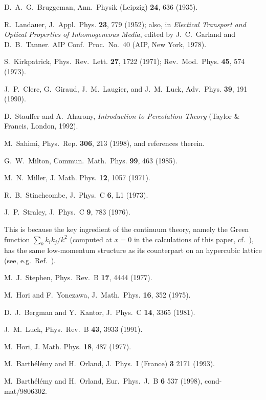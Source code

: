 \begin{references}
 D.~A.~G.~Bruggeman, Ann.\ Physik (Leipzig)
{\bf 24}, 636 (1935).

 R.~Landauer, J.~Appl.~Phys. {\bf 23}, 779 (1952);
also, in {\it Electical Transport and Optical Properties of 
Inhomogeneous Media}, edited by J.~C.~Garland and D.~B.~Tanner.
AIP Conf.~Proc.~No.\ 40 (AIP, New York, 1978).

 S.\ Kirkpatrick, Phys.\ Rev.\ Lett. {\bf 27},
1722 (1971); Rev.\ Mod.\ Phys. {\bf 45}, 574 (1973).

 J.~P.~Clerc, G.~Giraud, J.~M.~Laugier, and
J.~M.~Luck, Adv.\ Phys. {\bf 39}, 191 (1990).

 D.\ Stauffer and A.\ Aharony,
{\em Introduction to Percolation Theory} (Taylor \& Francis, London, 1992).

 M.\ Sahimi, Phys.\ Rep. {\bf 306}, 213 (1998),
and references therein.

 G.\ W.\ Milton, Commun.\ Math.\ Phys. {\bf 99}, 463
(1985).

 M.~N.~Miller, J. Math. Phys. {\bf 12}, 1057 (1971).

 R.~B.~Stinchcombe, J.\ Phys.\ C {\bf 6}, L1 (1973).

 J.~P.~Straley, J.\ Phys.\ C {\bf 9}, 783 (1976).

 This is because the key ingredient of the continuum
theory, namely the Green function $\sum_k k_i k_j/k^2$ (computed at $x=0$
in the calculations of this paper, cf.\ \cite{NOTE2}),
has the same low-momentum structure as its counterpart on an
hypercubic lattice (see, e.g.\ Ref.\ \cite{LUCK91}).

 M.~J.~Stephen, Phys.\ Rev.\ B {\bf 17}, 4444 (1977).

 M.~Hori and F.~Yonezawa, J.\ Math.\ Phys. {\bf 16},
352 (1975).

 D.~J.~Bergman and Y.~Kantor, J.\ Phys.\ C {\bf 14},
3365 (1981).

 J.~M.~Luck, Phys.\ Rev.\ B {\bf 43}, 3933 (1991).

 M.~Hori, J. Math. Phys. {\bf 18}, 487 (1977).

 M.~Barth\'{e}l\'{e}my and H.~Orland, J.\ Phys.\ I
(France) {\bf 3} 2171 (1993).

 M.~Barth\'{e}l\'{e}my and H.~Orland, Eur.\ Phys.\ J.\ B
{\bf 6} 537 (1998), cond-mat/9806302.


\end{references}
